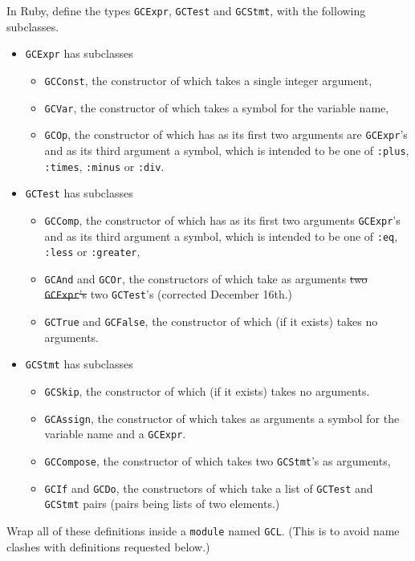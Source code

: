 \documentclass[11pt]{article}
\theoremstyle{definition}
\begin{document}
In Ruby, define the types \texttt{GCExpr}, \texttt{GCTest} and \texttt{GCStmt},
with the following subclasses.
\begin{itemize}
\item \texttt{GCExpr} has subclasses
\begin{itemize}
\item \texttt{GCConst}, the constructor of which takes a single integer argument,
\item \texttt{GCVar}, the constructor of which takes a symbol for the variable name,
\item \texttt{GCOp}, the constructor of which has as its first two arguments are \texttt{GCExpr}'s
and as its third argument a symbol,
which is intended to be one of \texttt{:plus}, \texttt{:times}, \texttt{:minus} or \texttt{:div}.
\end{itemize}
\item \texttt{GCTest} has subclasses
\begin{itemize}
\item \texttt{GCComp}, the constructor of which has as its first two arguments \texttt{GCExpr}'s
and as its third argument a symbol,
which is intended to be one of \texttt{:eq}, \texttt{:less} or \texttt{:greater},
\item \texttt{GCAnd} and \texttt{GCOr}, the constructors of which take as arguments \sout{two \texttt{GCExpr}'s} two \texttt{GCTest}'s
(corrected December 16th.)
\item \texttt{GCTrue} and \texttt{GCFalse}, the constructor of which (if it exists) takes no arguments.
\end{itemize}
\item \texttt{GCStmt} has subclasses
\begin{itemize}
\item \texttt{GCSkip}, the constructor of which (if it exists) takes no arguments.
\item \texttt{GCAssign}, the constructor of which takes as arguments
a symbol for the variable name and a \texttt{GCExpr}.
\item \texttt{GCCompose}, the constructor of which takes two \texttt{GCStmt}'s as arguments,
\item \texttt{GCIf} and \texttt{GCDo}, the constructors of which
take a list of \texttt{GCTest} and \texttt{GCStmt} pairs
(pairs being lists of two elements.)
\end{itemize}
\end{itemize}

Wrap all of these definitions inside a \texttt{module} named \texttt{GCL}.
(This is to avoid name clashes with definitions requested below.)
\end{document}
